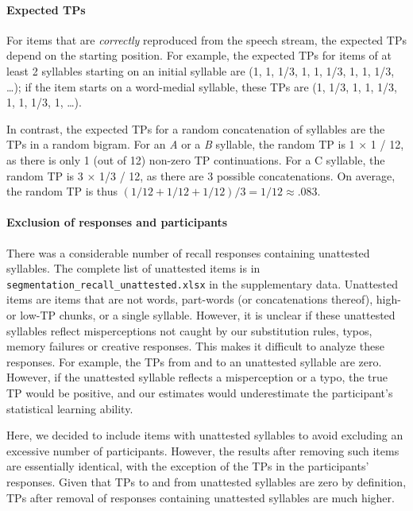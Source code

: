 \documentclass[
]{article}
\begin{document}
\hypertarget{expected-tps}{%
\paragraph{Expected TPs}\label{expected-tps}}

For items that are \emph{correctly} reproduced from the speech stream,
the expected TPs depend on the starting position. For example, the
expected TPs for items of at least 2 syllables starting on an initial
syllable are (1, 1, 1/3, 1, 1, 1/3, 1, 1, 1/3, \ldots); if the item
starts on a word-medial syllable, these TPs are (1, 1/3, 1, 1, 1/3, 1,
1, 1/3, 1, \ldots).

In contrast, the expected TPs for a random concatenation of syllables
are the TPs in a random bigram. For an \emph{A} or a \emph{B} syllable,
the random TP is 1 \(\times\) 1 / 12, as there is only 1 (out of 12)
non-zero TP continuations. For a C syllable, the random TP is 3
\(\times\) 1/3 / 12, as there are 3 possible concatenations. On average,
the random TP is thus \((1/12 + 1/12 + 1/12)/ 3 = 1/12 \approx .083\).

\hypertarget{exclusion-of-responses-and-participants}{%
\paragraph{Exclusion of responses and
participants}\label{exclusion-of-responses-and-participants}}

There was a considerable number of recall responses containing
unattested syllables. The complete list of unattested items is in
\texttt{segmentation\_recall\_unattested.xlsx} in the supplementary
data. Unattested items are items that are not words, part-words (or
concatenations thereof), high- or low-TP chunks, or a single syllable.
However, it is unclear if these unattested syllables reflect
misperceptions not caught by our substitution rules, typos, memory
failures or creative responses. This makes it difficult to analyze these
responses. For example, the TPs from and to an unattested syllable are
zero. However, if the unattested syllable reflects a misperception or a
typo, the true TP would be positive, and our estimates would
underestimate the participant's statistical learning ability.

Here, we decided to include items with unattested syllables to avoid
excluding an excessive number of participants. However, the results
after removing such items are essentially identical, with the exception
of the TPs in the participants' responses. Given that TPs to and from
unattested syllables are zero by definition, TPs after removal of
responses containing unattested syllables are much higher.
\end{document}
